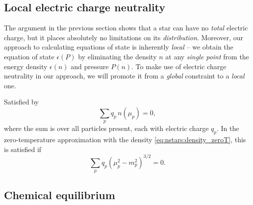 
\subsection{Local electric charge neutrality}



The argument in the previous section shows that a star can have no \emph{total} electric charge, but it places absolutely no limitations on its \emph{distribution}.
Moreover, our approach to calculating equations of state is inherently \emph{local} -- we obtain the equation of state $\epsilon(P)$ by eliminating the density $n$ at any \emph{single point} from the energy density $\epsilon(n)$ and pressure $P(n)$.
To make use of electric charge neutrality in our approach, we will promote it from a \emph{global} constraint to a \emph{local} one.




Satisfied by
\begin{equation}
	\sum_p q_p \, n(\mu_p) = 0 ,
\label{eq:lsm:charge_neutrality}
\end{equation}
where the sum is over all particles present, each with electric charge $q_p$.
In the zero-temperature approximation with the density \eqref{eq:nstars:density_zeroT}, this is satisfied if
\begin{equation}
	\sum_p q_p \left( \mu_p^2 - m_p^2 \right)^{3/2} = 0 .
\end{equation}

\subsection{Chemical equilibrium}


